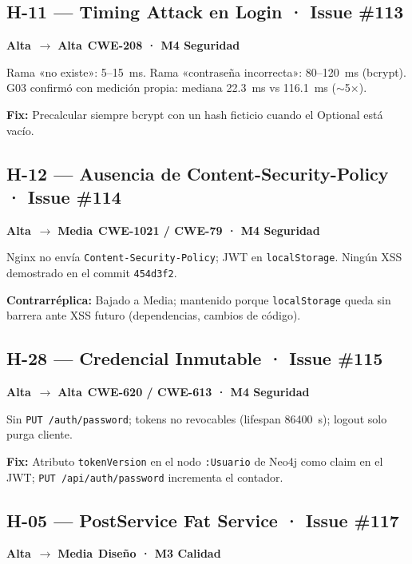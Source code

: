 \documentclass[10pt,a4paper]{article}
\newcommand{\code}[1]{\nolinkurl{#1}}
\newcommand{\badgeAlta}{\colorbox{orange!20}{\textcolor{orange!90!black}{\textbf{\footnotesize Alta}}}}
\newcommand{\badgeMedia}{\colorbox{yellow!35}{\textcolor{brown!90!black}{\textbf{\footnotesize Media}}}}
\begin{document}
\vspace{0.5em}
\subsection*{H-11 — Timing Attack en Login · Issue \#113}
\badgeAlta\ $\rightarrow$ \badgeAlta\ \quad \textbf{CWE-208 · M4 Seguridad}

\noindent Rama «no existe»: 5--15~ms. Rama «contraseña incorrecta»: 80--120~ms (bcrypt). G03 confirmó con medición propia: mediana 22.3~ms vs 116.1~ms ($\sim$5$\times$).\par
\noindent\textbf{Fix:} Precalcular siempre bcrypt con un hash ficticio cuando el Optional está vacío.

\vspace{0.5em}
\subsection*{H-12 — Ausencia de Content-Security-Policy · Issue \#114}
\badgeAlta\ $\rightarrow$ \badgeMedia\ \quad \textbf{CWE-1021 / CWE-79 · M4 Seguridad}

\noindent Nginx no envía \code{Content-Security-Policy}; JWT en \code{localStorage}. Ningún XSS demostrado en el commit \code{454d3f2}.\par
\noindent\textbf{Contrarréplica:} Bajado a Media; mantenido porque \code{localStorage} queda sin barrera ante XSS futuro (dependencias, cambios de código).

\vspace{0.5em}
\subsection*{H-28 — Credencial Inmutable · Issue \#115}
\badgeAlta\ $\rightarrow$ \badgeAlta\ \quad \textbf{CWE-620 / CWE-613 · M4 Seguridad}

\noindent Sin \code{PUT /auth/password}; tokens no revocables (lifespan 86400~s); logout solo purga cliente.\par
\noindent\textbf{Fix:} Atributo \code{tokenVersion} en el nodo \code{:Usuario} de Neo4j como claim en el JWT; \code{PUT /api/auth/password} incrementa el contador.

\vspace{0.5em}
\subsection*{H-05 — PostService Fat Service · Issue \#117}
\badgeAlta\ $\rightarrow$ \badgeMedia\ \quad \textbf{Diseño · M3 Calidad}
\end{document}
